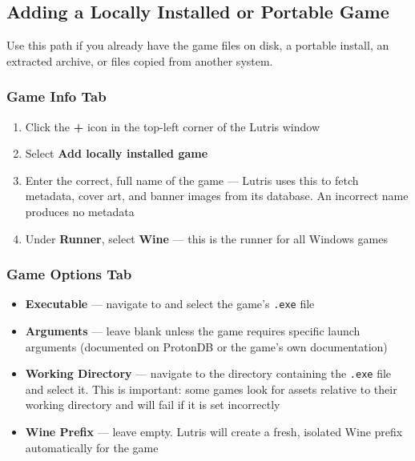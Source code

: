 \documentclass{article}
\newcommand{\code}[1]{\colorbox{codebg}{\texttt{#1}}}
\begin{document}
	

\subsection{Adding a Locally Installed or Portable Game}

Use this path if you already have the game files on disk, a portable install,
an extracted archive, or files copied from another system.

\subsubsection{Game Info Tab}

\begin{enumerate}[leftmargin=1.5em, nosep, label={\arabic*.}]
	\item Click the \textbf{+} icon in the top-left corner of the Lutris window
	\item Select \textbf{Add locally installed game}
	\item Enter the correct, full name of the game --- Lutris uses this to fetch
	metadata, cover art, and banner images from its database. An incorrect name
	produces no metadata
	\item Under \textbf{Runner}, select \textbf{Wine} --- this is the runner for
	all Windows games
\end{enumerate}

\subsubsection{Game Options Tab}

\begin{itemize}[leftmargin=1.5em, nosep, label={\tiny\textbullet}]
	\item \textbf{Executable} --- navigate to and select the game's \code{.exe} file
	\item \textbf{Arguments} --- leave blank unless the game requires specific
	launch arguments (documented on ProtonDB or the game's own documentation)
	\item \textbf{Working Directory} --- navigate to the directory containing the
	\code{.exe} file and select it. This is important: some games look for assets
	relative to their working directory and will fail if it is set incorrectly
	\item \textbf{Wine Prefix} --- leave empty. Lutris will create a fresh, isolated
	Wine prefix automatically for the game
\end{itemize}
\end{document}
